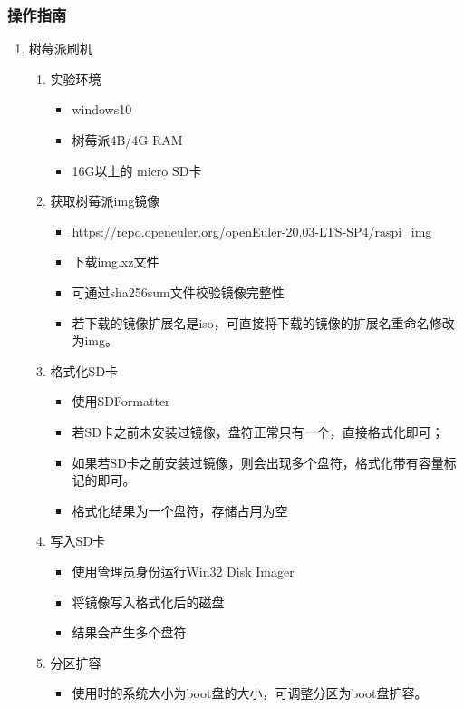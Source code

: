 \documentclass{article}
\begin{document}
\subsubsection{操作指南}
\begin{enumerate}
    \item 树莓派刷机
    \begin{enumerate}
        \item 实验环境
        \begin{itemize}
            \item windows10
            \item 树莓派4B/4G RAM
            \item 16G以上的 micro SD卡
        \end{itemize}
        \item 获取树莓派img镜像
        \begin{itemize}
            \item \url{https://repo.openeuler.org/openEuler-20.03-LTS-SP4/raspi_img}
            \item 下载img.xz文件
            \item 可通过sha256sum文件校验镜像完整性
            \item 若下载的镜像扩展名是iso，可直接将下载的镜像的扩展名重命名修改为img。
        \end{itemize}
        \item 格式化SD卡
        \begin{itemize}
            \item 使用SDFormatter
            \item 若SD卡之前未安装过镜像，盘符正常只有一个，直接格式化即可；
            \item 如果若SD卡之前安装过镜像，则会出现多个盘符，格式化带有容量标记的即可。
            \item 格式化结果为一个盘符，存储占用为空
        \end{itemize}
        \item 写入SD卡
        \begin{itemize}
            \item 使用管理员身份运行Win32 Disk Imager
            \item 将镜像写入格式化后的磁盘
            \item 结果会产生多个盘符
        \end{itemize}
        \item 分区扩容
        \begin{itemize}
            \item 使用时的系统大小为boot盘的大小，可调整分区为boot盘扩容。

\end{itemize}
\end{enumerate}
\end{enumerate}
\end{document}
